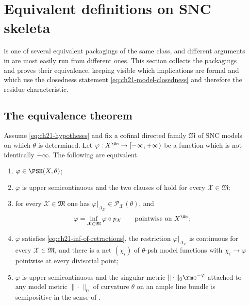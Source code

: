 \section{Equivalent definitions on SNC skeleta}
\label{sec:ch21-equivalent}

 is one of several equivalent packagings of the same
class, and different arguments in  are most easily run from
different ones.  This section collects the packagings and proves their
equivalence, keeping visible which implications are formal and which use the
closedness statement \eqref{eq:ch21-model-closedness} and therefore the
residue characteristic.

\subsection{The equivalence theorem}
\label{sec:ch21-equivalence-theorem}

\begin{theorem}
\label{thm:ch21-equivalent}
Assume \eqref{eq:ch21-hypotheses} and fix a cofinal directed family
\(\mathfrak M\) of SNC models on which \(\theta\) is determined.  Let
\(\varphi:X^{\An}\to[-\infty,+\infty)\) be a function which is not
identically \(-\infty\).  The following are equivalent.

\begin{enumerate}
\item\label{itm:ch21-eq:def}
\(\varphi\in\PSH(X,\theta)\);
\item\label{itm:ch21-eq:cofinal}
\(\varphi\) is upper semicontinuous and the two clauses of
 hold for every \(\mathcal X\in\mathfrak M\);
\item\label{itm:ch21-eq:inf}
for every \(\mathcal X\in\mathfrak M\) one has
\(\varphi|_{\Delta_{\mathcal X}}\in\mathcal P_{\mathcal X}(\theta)\), and
\begin{equation}
\label{eq:ch21-inf-of-retractions}
 \varphi=\inf_{\mathcal X\in\mathfrak M}\varphi\circ p_{\mathcal X}
 \qquad\text{pointwise on }X^{\An};
\end{equation}
\item\label{itm:ch21-eq:divisorial}
\(\varphi\) satisfies \eqref{eq:ch21-inf-of-retractions}, the restriction
\(\varphi|_{\Delta_{\mathcal X}}\) is continuous for every
\(\mathcal X\in\mathfrak M\), and there is a net \((\chi_i)\) of
\(\theta\)-psh model functions with \(\chi_i\to\varphi\) pointwise at every
divisorial point;
\item\label{itm:ch21-eq:metric}
\(\varphi\) is upper semicontinuous and the singular metric
\(\|\cdot\|_0\rme^{-\varphi}\) attached to any model metric
\(\|\cdot\|_0\) of curvature \(\theta\) on an ample line bundle is
semipositive in the sense of .
\end{enumerate}
\end{theorem}

